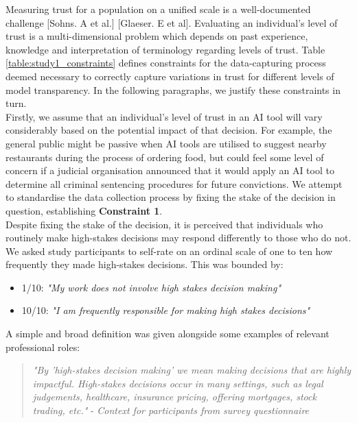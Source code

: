 \documentclass[manuscript,screen,review]{acmart}
\begin{document}
Measuring trust for a population on a unified scale is a well-documented challenge [Sohns. A et al.] [Glaeser. E et al]. Evaluating an individual's level of trust is a multi-dimensional problem which depends on past experience, knowledge and interpretation of terminology regarding levels of trust. Table \ref{table:study1_constraints} defines constraints for the data-capturing process deemed necessary to correctly capture variations in trust for different levels of model transparency. In the following paragraphs, we justify these constraints in turn.\\

 Firstly, we assume that an individual's level of trust in an AI tool will vary considerably based on the potential impact of that decision. For example, the general public might be passive when AI tools are utilised to suggest nearby restaurants during the process of ordering food, but could feel some level of concern if a judicial organisation announced that it would apply an AI tool to determine all criminal sentencing procedures for future convictions. We attempt to standardise the data collection process by fixing the stake of the decision in question, establishing \textbf{Constraint 1}. \\
 
Despite fixing the stake of the decision, it is perceived that individuals who routinely make high-stakes decisions may respond differently to those who do not. We asked study participants to self-rate on an ordinal scale of one to ten how frequently they made high-stakes decisions. This was bounded by:

\begin{itemize}
    \item 1/10: \textit{"My work does not involve high stakes decision making"} 
    \item 10/10: \textit{"I am frequently responsible for making high stakes decisions"}
\end{itemize}

 A simple and broad definition was given alongside some examples of relevant professional roles:

\begin{quote}
    \textit{"By 'high-stakes decision making' we mean making decisions that are highly impactful. High-stakes decisions occur in many settings, such as legal judgements, healthcare, insurance pricing, offering mortgages, stock trading, etc."} - \textit{Context for participants from survey questionnaire}
\end{quote}
\end{document}
